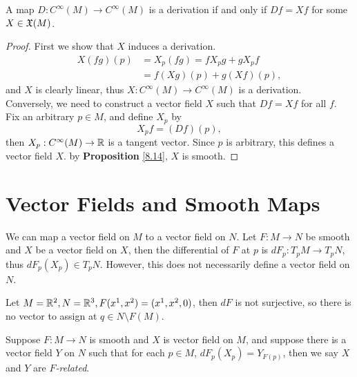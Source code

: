 \begin{proposition}
    A map $D:C^\infty(M) \to C^\infty(M)$ is a derivation if and only if $Df = Xf$ for some $X \in \frak{X}(M)$. 
\end{proposition}
\begin{proof}
    First we show that $X$ induces a derivation. 
    \begin{align*}
    X(fg)(p) &= X_p(fg) = f X_p g + g X_p f \\
    &= f(Xg)(p) + g(Xf)(p),
    \end{align*}
    and $X$ is clearly linear, thus $X:C^\infty(M) \to C^\infty(M)$ is a derivation. \\
    Conversely, we need to construct a vector field $X$ such that $Df = Xf$ for all $f$. Fix an arbitrary $p \in M$, and define 
    $X_p$ by 
    $$X_p f = (Df)(p), $$ then $X_p:C^\infty(M) \to \mathbb{R}$ is a tangent vector. Since $p$ is arbitrary, this defines a vector field $X$. by \textbf{Proposition} \ref{8.14}, $X$ is smooth. 
\end{proof}

\section{Vector Fields and Smooth Maps}
We can map a vector field on $M$ to a vector field on $N$. Let $F:M \to N$ be smooth and $X$ be a vector field on $X$, then the differential of $F$ at $p$ is $dF_p:T_pM \to T_pN$, thus $dF_p(X_p) \in T_pN$. However, this does not necessarily define a vector field on $N$.
\begin{example}
    Let $M = \mathbb{R}^2, N = \mathbb{R}^3, F(x^1,x^2) = (x^1,x^2,0)$, then $dF$ is not surjective, so there is no vector to assign at $q \in N \setminus F(M)$. 
\end{example}
\begin{definition}
    Suppose $F:M \to N$ is smooth and $X$ is vector field on $M$, and suppose there is a vector field $Y$ on $N$ such that for each $p \in M$, $dF_p(X_p) = Y_{F(p)}$, then we say $X$ and $Y$ are \textit{$F$-related}.
\end{definition}

